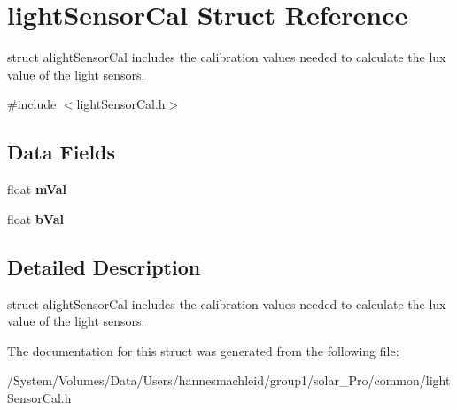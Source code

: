 \hypertarget{structlight_sensor_cal}{}\section{light\+Sensor\+Cal Struct Reference}
\label{structlight_sensor_cal}


struct alight\+Sensor\+Cal includes the calibration values needed to calculate the lux value of the light sensors.  




{\ttfamily \#include $<$light\+Sensor\+Cal.\+h$>$}

\subsection*{Data Fields}
\begin{DoxyCompactItemize}
\item 
\mbox{\label{structlight_sensor_cal_ab01fbfc64d2bad6ba3e06d69654ca31a}} 
float {\bfseries m\+Val}
\item 
\mbox{\label{structlight_sensor_cal_a91787bb45cd52ede73a06492408a376b}} 
float {\bfseries b\+Val}
\end{DoxyCompactItemize}


\subsection{Detailed Description}
struct alight\+Sensor\+Cal includes the calibration values needed to calculate the lux value of the light sensors. 

The documentation for this struct was generated from the following file\+:\begin{DoxyCompactItemize}
\item 
/\+System/\+Volumes/\+Data/\+Users/hannesmachleid/group1/solar\+\_\+\+Pro/common/light\+Sensor\+Cal.\+h\end{DoxyCompactItemize}
